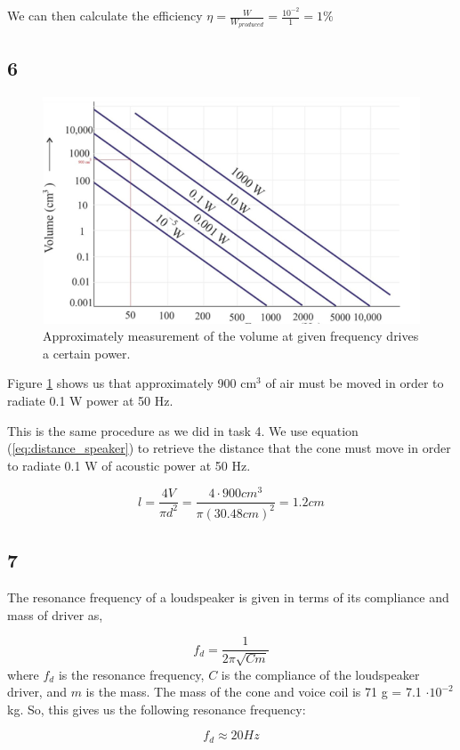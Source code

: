 \documentclass{article}
\begin{document}
We can then calculate the efficiency $\eta  = \frac{W}{W_{produced}} = \frac{10^{-2}}{1} = 1 \%$


\subsection*{6}

\begin{figure}[H]
    \centering
    \includegraphics[scale=1.5]{figures/oving3_3_solutions.png}
    \caption{Approximately measurement of the volume at given frequency drives a certain power.}
    \label{fig:loudspeaker}
\end{figure}

Figure \ref{fig:loudspeaker} shows us that approximately 900 cm$^3$ of air must be moved in order to radiate 0.1 W power at 50 Hz.

This is the same procedure as we did in task 4. We use equation (\ref{eq:distance_speaker}) to retrieve the distance that the cone must move in order to radiate 0.1 W of acoustic power at 50 Hz.

\begin{equation}
    l=\frac{4V}{\pi d^2}=\frac{4 \cdot 900 cm^3}{\pi (30.48 cm)^2} = 1.2 cm
\end{equation}

\subsection*{7}

The resonance frequency of a loudspeaker is given in terms of its compliance  and mass of driver as,

\begin{equation}
    f_d =\frac{1}{2 \pi \sqrt{C m} }
\end{equation}
where $f_d$ is the resonance frequency, $C$ is the compliance of the loudspeaker driver, and $m$ is the mass. 
The mass of the cone and voice coil is 71 g = 7.1 $\cdot 10^{-2}$ kg. So, this gives us the following resonance frequency:

\begin{equation}
    f_d \approx 20 Hz
\end{equation}

%
%
\end{document}

